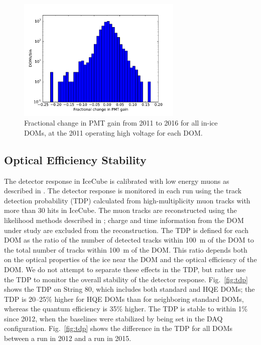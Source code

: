 \begin{figure}[!h]
 \centering
 \includegraphics[width=0.7\textwidth]{graphics/dom/reliability/pmt_gainshift.pdf}
 \caption{Fractional change in PMT gain from 2011 to 2016 for all in-ice
   DOMs, at the 2011 operating high voltage for each DOM.}
 \label{fig:pmt_gainshift}
\end{figure}

\subsection{\label{sec:optical_stability}Optical Efficiency Stability}

The detector response in IceCube is calibrated with low energy muons as
described in \cite{IC3:ereco}. The detector response is monitored in each run using the track
detection probability (TDP) calculated from high-multiplicity muon tracks
with more than 30 hits in IceCube. The muon 
tracks are reconstructed using the likelihood methods described in
\cite{Ahrens:2003fg}; charge and time information from the DOM under
study are excluded
from the reconstruction. The TDP is
defined for each DOM as the ratio of the number of detected tracks
within 100~m of the DOM to the total number of tracks within 100~m of
the DOM. This ratio depends both on the optical properties of the ice
near the DOM and the optical efficiency of the DOM. We do not attempt
to separate
these effects in the TDP, but rather use the TDP to monitor the
overall stability of the detector response. Fig.~\ref{fig:tdp} shows the TDP on
String 80, which includes both standard and HQE DOMs; the TDP is
20--25\% higher for HQE DOMs than for neighboring standard
DOMs, whereas the quantum efficiency is 35\% higher. The TDP is stable to within 1\% since 2012, when the baselines
were stabilized by being set in the DAQ configuration. Fig.~\ref{fig:tdp} shows
the difference in the TDP for all DOMs between a run in 2012 and a run
in 2015.

